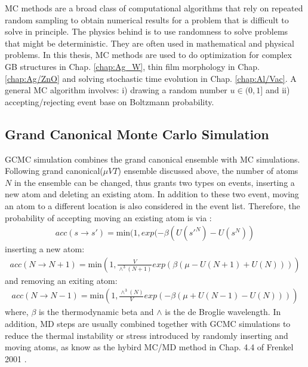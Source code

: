 \ac{MC} methods are a broad class of computational algorithms that rely on repeated random sampling to obtain numerical results for a problem that is difficult to solve in principle. The physics behind is to use randomness to solve problems that might be deterministic. They are often used in mathematical \cite{hubbard2009modeling} and physical \cite{bortz1975new} problems. In this thesis, \ac{MC} methods are used to do optimization for complex \ac{GB} structures in Chap. \ref{chap:Ag_W}, thin film morphology in Chap. \ref{chap:Ag/ZnO} and solving stochastic time evolution in Chap. \ref{chap:Al/Vac}. A general \ac{MC} algorithm involves: i) drawing a random number $u \in (0,1]$ and ii) accepting/rejecting event base on Boltzmann probability.

\subsection{Grand Canonical Monte Carlo Simulation}
\label{Chap:Mech:GCMC:GCMC}

\ac{GCMC} simulation combines the grand canonical ensemble with \ac{MC} simulations. Following grand canonical($\mu VT$) ensemble discussed above, the number of atoms $N$ in the ensemble can be changed, thus grants two types on events, inserting a new atom and deleting an existing atom. In addition to these two event, moving an atom to a different location is also considered in the event list. Therefore, the probability of accepting moving an existing atom is via \cite{frenkel2001understanding}:
\begin{align}
acc(s \rightarrow s') = \text{min}(1, exp(-\beta(U(s'^N) - U(s^N))
\label{Chap:Meth:eq:acc:move}
\end{align}
inserting a new atom:
\begin{align}
acc(N \rightarrow N+1) = \text{min}(1, \frac{V}{\wedge^3(N+1)}exp(\beta(\mu - U(N + 1) + U(N)))) \label{Chap:Meth:eq:acc:insert}
\end{align}
and removing an exiting atom:
\begin{align}
acc(N \rightarrow N-1) = \text{min}(1, \frac{\wedge^3(N)}{V}exp(-\beta(\mu + U(N - 1) - U(N)))) \label{Chap:Meth:eq:acc:remove}
\end{align}
where, $\beta$ is the thermodynamic beta and $\wedge$ is the de Broglie wavelength. In addition, \ac{MD} steps are usually combined together with \ac{GCMC} simulations to reduce the thermal instability or stress introduced by randomly inserting and moving atoms, as know as the hybird \ac{MC}/\ac{MD} method in Chap. 4.4 of Frenkel 2001 \cite{frenkel2001understanding}.